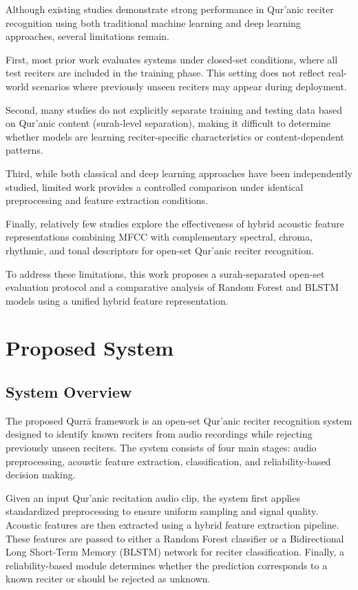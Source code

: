 \documentclass[conference]{IEEEtran}
\begin{document}
Although existing studies demonstrate strong performance in Qur'anic reciter recognition using both traditional machine learning and deep learning approaches, several limitations remain.

First, most prior work evaluates systems under closed-set conditions, where all test reciters are included in the training phase. This setting does not reflect real-world scenarios where previously unseen reciters may appear during deployment.

Second, many studies do not explicitly separate training and testing data based on Qur'anic content (surah-level separation), making it difficult to determine whether models are learning reciter-specific characteristics or content-dependent patterns.

Third, while both classical and deep learning approaches have been independently studied, limited work provides a controlled comparison under identical preprocessing and feature extraction conditions.

Finally, relatively few studies explore the effectiveness of hybrid acoustic feature representations combining MFCC with complementary spectral, chroma, rhythmic, and tonal descriptors for open-set Qur'anic reciter recognition.

To address these limitations, this work proposes a surah-separated open-set evaluation protocol and a comparative analysis of Random Forest and BLSTM models using a unified hybrid feature representation.

\section{Proposed System}

\subsection{System Overview}

The proposed Qurr\={a} framework is an open-set Qur'anic reciter recognition system designed to identify known reciters from audio recordings while rejecting previously unseen reciters. The system consists of four main stages: audio preprocessing, acoustic feature extraction, classification, and reliability-based decision making.

Given an input Qur'anic recitation audio clip, the system first applies standardized preprocessing to ensure uniform sampling and signal quality. Acoustic features are then extracted using a hybrid feature extraction pipeline. These features are passed to either a Random Forest classifier or a Bidirectional Long Short-Term Memory (BLSTM) network for reciter classification. Finally, a reliability-based module determines whether the prediction corresponds to a known reciter or should be rejected as unknown.
\end{document}
